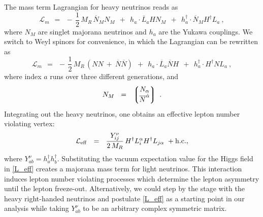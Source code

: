 \documentclass[12pt]{revtex4}
\newcommand{\ov}{\overline}
\begin{document}
The mass term Lagrangian for heavy neutrinos reads as
\begin{equation}
	\mathcal{L}_m  ~~=~~ -\,\frac 12\, M_R\, \ov{N}{}_MN_M ~~+~~
				h_a\cdot \ov{L}_aHN_M ~~+~~  
				h_a^\dagger\cdot \ov{N}{}_MH^\dagger L_a~,
\end{equation}
	where $ N_M $ are singlet majorana neutrinos and $ h_a $ are the Yukawa couplings.
	We switch to Weyl spinors for convenience, in which the Lagrangian can be rewritten as
\begin{equation}
	\mathcal{L}_m  ~~=~~ 
	-\,\frac 12\, M_R\, \left( NN ~+~ \ov{N}\ov{N} \right) ~~+~~
				h_a\cdot \ov{L}_a\ov{ N}H ~~+~~  
				h_a^\dagger\cdot H^\dagger N L_a~,
\end{equation}
	where index $a$ runs over three different generations, and
\[	
	N_M ~~=~~ \left\lgroup 
		\begin{matrix}
			N_\alpha \\
			\ov{N}^{\dot{\alpha}}
		\end{matrix}
		\right\rgroup~.
\]
	Integrating out the heavy neutrinos, one obtains an effective lepton number violating vertex:
\begin{equation}
\label{L_eff}
	\mathcal{L}_{\rm eff} ~~=~~ \frac{Y_{ij}^\nu}{2\, M_R} \, H^\dag L_i^\alpha H^\dag L_{j\alpha}~
+{\rm h.c.},
\end{equation}
where $Y_{ab}^\nu=h_a^\dag h_b^\dag$.
	Substituting the vacuum expectation value 
for the Higgs field in \eqref{L_eff}
	creates a majorana mass term for light neutrinos. 
This interaction induces lepton number
violating processes which determine the lepton asymmetry
	until the lepton freeze-out. Alternatively, we could step by the stage with the heavy right-handed 
	neutrinos and postulate \eqref{L_eff} as a starting point in our analysis while taking $Y^\nu_{ab}$
	to be an arbitrary complex symmetric matrix. 
	

\end{document}
